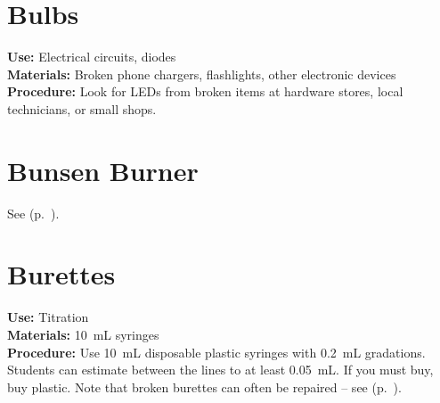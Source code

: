 \begin{multicols}{2}
\section{Bulbs}
\label{sec:lightbulbs}
\vspace{-10pt}
\textbf{Use:} Electrical circuits, diodes\\
\textbf{Materials:} Broken phone chargers, flashlights, other electronic devices\\
\textbf{Procedure:} Look for LEDs from broken items at hardware stores, local technicians, or small shops. 

\section{Bunsen Burner}
\label{sec:bunsen-burner}
See  (p.~\pageref{sec:heatsources}).

\section{Burettes}
\label{sec:burettes}
\vspace{-10pt}
\textbf{Use:} Titration\\
\textbf{Materials:} 10~mL syringes \\
\textbf{Procedure:} Use 10~mL disposable plastic syringes with 0.2~mL gradations. Students can estimate between the lines to at least 0.05~mL. If you must buy, buy plastic. Note that broken burettes can often be repaired -- see  (p.~\pageref{cha:burettes}).




\end{multicols}
